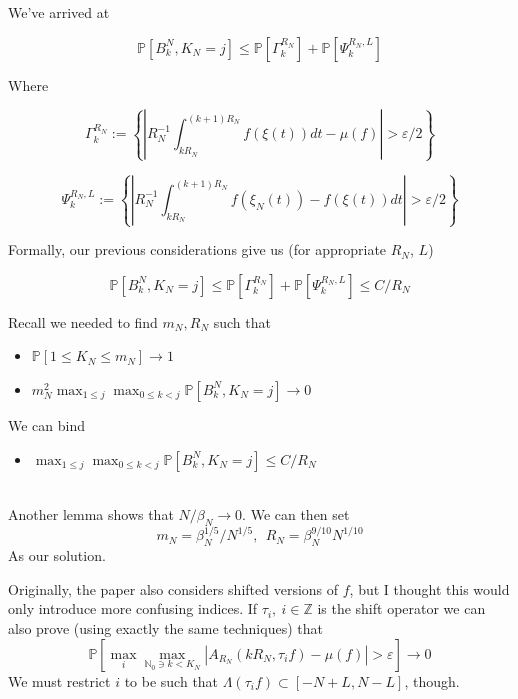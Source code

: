 \documentclass{beamer}
\begin{document}
\begin{frame}
    We've arrived at

    \[
        \mathbb{P}\left[ B^N_k, K_N = j \right] \leq \mathbb{P}\left[\Gamma_k^{R_N}\right] + \mathbb{P}\left[\Psi_k^{R_N, L} \right]
    \]

    Where

    \[
        \Gamma_k^{R_N} := \left\{  \left|R_N^{-1}\int_{kR_N}^{(k+1)R_N}f(\xi(t))dt - \mu(f)\right| > \varepsilon/2\right\}
    \]

    \[
        \Psi_k^{R_N, L} := \left\{  \left|R_N^{-1}\int_{kR_N}^{(k+1)R_N}f(\xi_N(t)) - f(\xi(t))dt \right| > \varepsilon/2 \right\}
    \]

    Formally, our previous considerations give us (for appropriate $R_N$, $L$)

    \[
        \mathbb{P}\left[ B^N_k, K_N = j \right] \leq \mathbb{P}\left[\Gamma_k^{R_N}\right] + \mathbb{P}\left[\Psi_k^{R_N, L}\right] \leq C/R_N
    \]
\end{frame}

\begin{frame}
    Recall we needed to find $m_N, R_N$ such that 
    \begin{itemize}
        \item $\mathbb{P}[1 \leq K_N \leq m_N] \rightarrow 1$
        \item $m_N^2\max_{1 \leq j}\max_{0 \leq k < j}\mathbb{P}\left[ B^N_k, K_{N} = j \right] \rightarrow 0$
    \end{itemize}
    We can bind
    \begin{itemize}
        \item $\max_{1 \leq j}\max_{0 \leq k < j}\mathbb{P}\left[ B^N_k, K_{N} = j \right] \leq C/R_N$
    \end{itemize}
    ~\\
    Another lemma shows that $N/\beta_N \rightarrow 0$. We can then set 
    \[m_N = \beta_N^{1/5}/N^{1/5}, \ \  R_N = \beta_N^{9/10} N^{1/10}\]
    As our solution.
\end{frame}

\begin{frame}
    Originally, the paper also considers shifted versions of $f$, but I thought this would only introduce more confusing indices. If $\tau_i,\ i\in \mathbb{Z}$ is the shift operator
    we can also prove (using exactly the same techniques) that
          \[
              \mathbb{P}\left[ \max_{i}\max_{\mathbb{N}_0 \ni k < K_N}|A_{R_N}(kR_N, \tau_if) - \mu(f)| > \varepsilon\right] \rightarrow 0
          \]
    We must restrict $i$ to be such that $\Lambda(\tau_if) \subset [-N+L, N-L]$, though.
    \\~\\
\end{frame}
\end{document}
